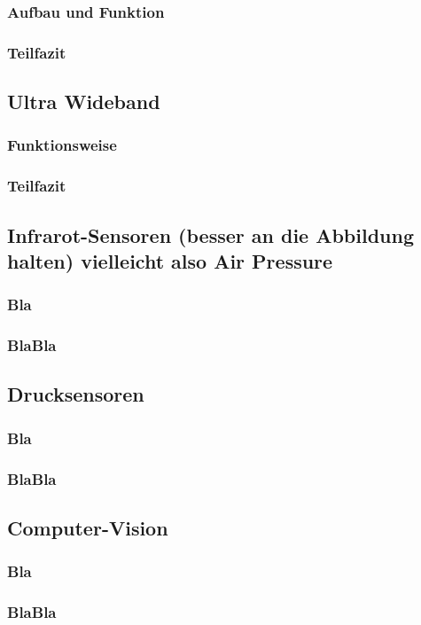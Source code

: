 \subsubsection{Aufbau und Funktion}
\subsubsection{Teilfazit}
\subsection{Ultra Wideband}
\subsubsection{Funktionsweise}
\subsubsection{Teilfazit}
\subsection{Infrarot-Sensoren (besser an die Abbildung halten) vielleicht also Air Pressure}
\subsubsection{Bla}
\subsubsection{BlaBla}
\subsection{Drucksensoren}
\subsubsection{Bla}
\subsubsection{BlaBla}
\subsection{Computer-Vision}
\subsubsection{Bla}
\subsubsection{BlaBla}

